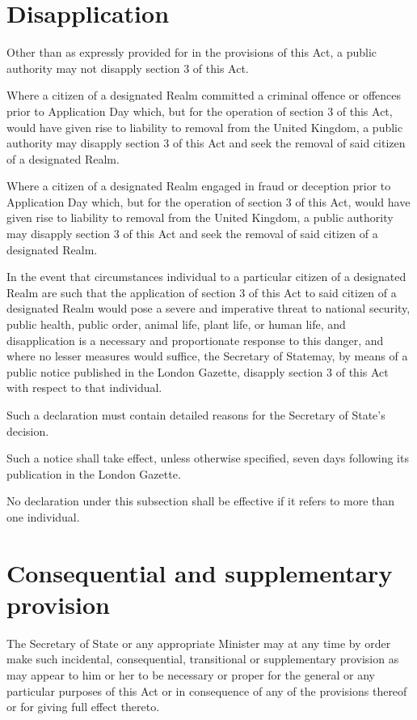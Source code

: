 \documentclass[private]{ukbill}
\begin{document}
\section{Disapplication}
\begin{numstat}
	\item Other than as expressly provided for in the provisions of this Act, a public authority may not disapply section 3 of this Act.
	\item 	Where a citizen of a designated Realm committed a criminal offence or offences prior to Application Day which, but for the operation of section 3 of this Act, would have given rise to liability to removal from the United Kingdom, a public authority may disapply section 3 of this Act and seek the removal of said citizen of a designated Realm.
	\item 	Where a citizen of a designated Realm engaged in fraud or deception prior to Application Day which, but for the operation of section 3 of this Act, would have given rise to liability to removal from the United Kingdom, a public authority may disapply section 3 of this Act and seek the removal of said citizen of a designated Realm.
	\item In the event that circumstances individual to a particular citizen of a designated Realm are such that the application of section 3 of this Act to said citizen of a designated Realm would pose a severe and imperative threat to national security, public health, public order, animal life, plant life, or human life, and disapplication is a necessary and proportionate response to this danger, and where no lesser measures would suffice, the Secretary of Statemay, by means of a public notice published in the London Gazette, disapply section 3 of this Act  with respect to that individual.\begin{alphstat}
	\item Such a declaration must contain detailed reasons for the Secretary of State's decision. 
	\item Such a notice shall take effect, unless otherwise specified,  seven days following  its publication in the London Gazette.
	\item No declaration under this subsection shall be effective if it refers to more than one individual.
\end{alphstat}
\end{numstat}

\section{Consequential and supplementary provision}
\begin{nostat}
\item The Secretary of State or any appropriate Minister may at any time by order make such incidental, consequential, transitional or supplementary provision as may appear to him or her to be necessary or proper for the general or any particular purposes of this Act or in consequence of any of the provisions thereof or for giving full effect thereto.
\end{nostat}	
\end{document}
